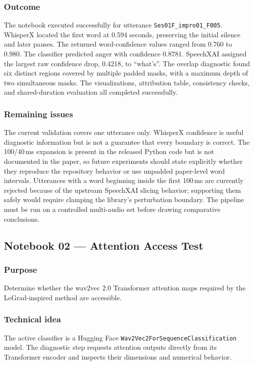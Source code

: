 \documentclass[11pt]{article}
\begin{document}
\subsubsection*{Outcome}
The notebook executed successfully for utterance \texttt{Ses01F\_impro01\_F005}. WhisperX located the first word at 0.594 seconds, preserving the initial silence and later pauses. The returned word-confidence values ranged from 0.760 to 0.980. The classifier predicted anger with confidence 0.8781. SpeechXAI assigned the largest raw confidence drop, 0.4218, to ``what's''. The overlap diagnostic found six distinct regions covered by multiple padded masks, with a maximum depth of two simultaneous masks. The visualizations, attribution table, consistency checks, and shared-duration evaluation all completed successfully.

\subsubsection*{Remaining issues}
The current validation covers one utterance only. WhisperX confidence is useful diagnostic information but is not a guarantee that every boundary is correct. The 100/40\,ms expansion is present in the released Python code but is not documented in the paper, so future experiments should state explicitly whether they reproduce the repository behavior or use unpadded paper-level word intervals. Utterances with a word beginning inside the first 100\,ms are currently rejected because of the upstream SpeechXAI slicing behavior; supporting them safely would require clamping the library's perturbation boundary. The pipeline must be run on a controlled multi-audio set before drawing comparative conclusions.

\subsection{Notebook 02 --- Attention Access Test}

\subsubsection*{Purpose}
Determine whether the wav2vec 2.0 Transformer attention maps required by the LeGrad-inspired method are accessible.

\subsubsection*{Technical idea}
The active classifier is a Hugging Face \texttt{Wav2Vec2ForSequenceClassification} model. The diagnostic step requests attention outputs directly from its Transformer encoder and inspects their dimensions and numerical behavior.
\end{document}
